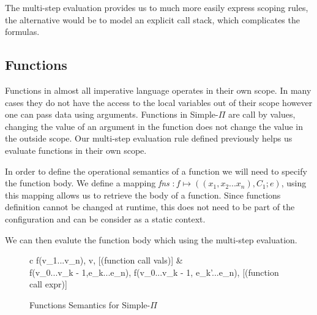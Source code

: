\documentclass[a4paper,12pt]{report}
\begin{document}
\par
The multi-step evaluation provides us to much more easily express scoping rules, 
the alternative would be to model an explicit call stack, which complicates the 
formulas.

\subsection{Functions}
Functions in almost all imperative language operates in their own scope. In many 
cases they do not have the access to the local variables out of their scope however 
one can pass data using arguments. Functions in Simple-$\Pi$ are call by values, 
changing the value of an argument in the function does not change the value in 
the outside scope. Our multi-step evaluation rule defined previously helps us 
evaluate functions in their own scope. 

\par
In order to define the operational semantics of a function we will need to 
specify the function body. We define a mapping 
\textit{fns} $: f \mapsto ((x_1, x_2...x_n), C_1;e)$, 
using this mapping allows us to retrieve the body of a function. Since functions 
definition cannot be changed at runtime, this does not need to be part of the 
configuration and can be consider as a static context.

\par
We can then evalute the function body which using the multi-step evaluation.

\begin{figure}[H]
  \begin{center}
    \begin{tabular} {c}
      {\langle f(v_1...v_n), \sigma \rangle \Longrightarrow \langle v, \sigma \rangle} [(function call vals)]
      & \\
      {\langle f(v_0...v_{k - 1},e_k...e_n), \sigma \rangle \Longrightarrow \langle f(v_0...v_{k - 1}, e_{k}'...e_n), \sigma \rangle} [(function call expr)]
    \end{tabular}
  \end{center}
  \caption{Functions Semantics for Simple-$\Pi$}
\end{figure}
\end{document}
